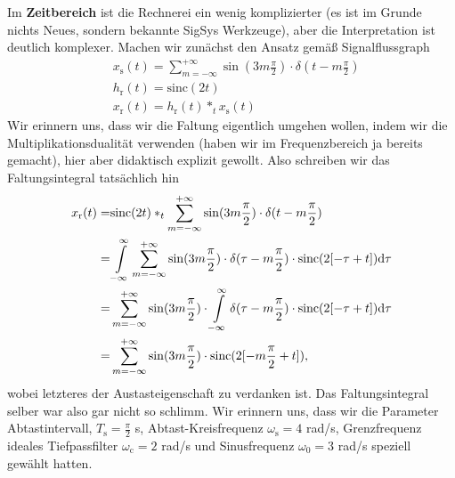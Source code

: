 \begin{Loesung}
Im \textbf{Zeitbereich} ist die Rechnerei ein wenig komplizierter (es ist im Grunde
nichts Neues, sondern bekannte SigSys Werkzeuge), aber die Interpretation ist deutlich
komplexer.
Machen wir zunächst den Ansatz gemäß Signalflussgraph
\begin{align}
&x_\mathrm{s}(t) =
\sum_{m=-\infty}^{+\infty} \sin(3 m \frac{\pi}{2}) \cdot \delta(t-m \frac{\pi}{2})\\
&h_\mathrm{r}(t) = \mathrm{sinc}(2 t)\\
&x_\mathrm{r}(t) = h_\mathrm{r}(t) \ast_t x_\mathrm{s}(t)
\end{align}
Wir erinnern uns, dass wir die Faltung eigentlich umgehen wollen, indem
wir die Multiplikationsdualität verwenden (haben wir im Frequenzbereich
ja bereits gemacht), hier aber didaktisch explizit gewollt.
Also schreiben wir das Faltungsintegral tatsächlich hin
\begin{align}
x_\mathrm{r}(t) =&
\mathrm{sinc}(2 t)
\ast_t
\sum_{m=-\infty}^{+\infty} \sin(3 m \frac{\pi}{2}) \cdot \delta(t-m \frac{\pi}{2})\\
=&
\int\limits_{-\infty}^{\infty}
\sum_{m=-\infty}^{+\infty} \sin(3 m \frac{\pi}{2}) \cdot \delta(\tau-m \frac{\pi}{2})
\cdot \mathrm{sinc}(2 [-\tau + t]) \mathrm{d} \tau\\
=&
\sum_{m=-\infty}^{+\infty} \sin(3 m \frac{\pi}{2}) \cdot
\int\limits_{-\infty}^{\infty} \delta(\tau-m \frac{\pi}{2})
\cdot \mathrm{sinc}(2 [-\tau + t]) \mathrm{d} \tau\\
=&
\sum_{m=-\infty}^{+\infty} \sin(3 m \frac{\pi}{2}) \cdot \mathrm{sinc}(2 [-m \frac{\pi}{2} + t]),
\label{eq:EF235EE3D8_SincSpecialResult}
\end{align}
wobei letzteres der Austasteigenschaft zu verdanken ist. Das Faltungsintegral selber
war also gar nicht so schlimm.
%
Wir erinnern uns, dass wir die Parameter Abtastintervall, $T_\mathrm{s}=\frac{\pi}{2}$ s,
Abtast-Kreisfrequenz $\omega_\mathrm{s}=4$  rad/s, Grenzfrequenz ideales
Tiefpassfilter $\omega_\mathrm{c} = 2$ rad/s und Sinusfrequenz $\omega_0=3$ rad/s
speziell gewählt hatten.
\end{Loesung}
%
%

